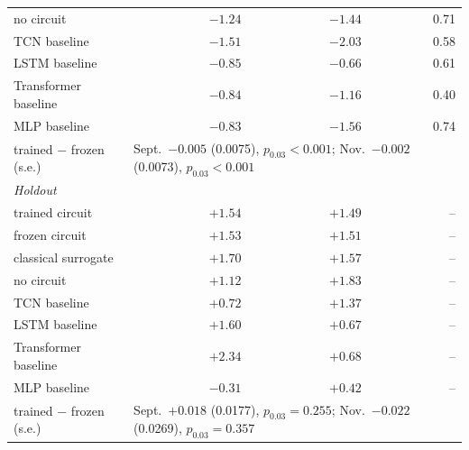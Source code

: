 \begin{table}[t]
\begin{tabular}{lrrr}
\quad no circuit & $-1.24$ & $-1.44$ & 0.71 \\
\quad TCN baseline & $-1.51$ & $-2.03$ & 0.58 \\
\quad LSTM baseline & $-0.85$ & $-0.66$ & 0.61 \\
\quad Transformer baseline & $-0.84$ & $-1.16$ & 0.40 \\
\quad MLP baseline & $-0.83$ & $-1.56$ & 0.74 \\
\quad trained $-$ frozen (s.e.) & \multicolumn{3}{l}{Sept.\ $-0.005$ (0.0075), $p_{0.03}<0.001$; Nov.\ $-0.002$ (0.0073), $p_{0.03}<0.001$} \\[2pt]
\multicolumn{4}{l}{\emph{Holdout}} \\
\quad trained circuit & $+1.54$ & $+1.49$ & -- \\
\quad frozen circuit & $+1.53$ & $+1.51$ & -- \\
\quad classical surrogate & $+1.70$ & $+1.57$ & -- \\
\quad no circuit & $+1.12$ & $+1.83$ & -- \\
\quad TCN baseline & $+0.72$ & $+1.37$ & -- \\
\quad LSTM baseline & $+1.60$ & $+0.67$ & -- \\
\quad Transformer baseline & $+2.34$ & $+0.68$ & -- \\
\quad MLP baseline & $-0.31$ & $+0.42$ & -- \\
\quad trained $-$ frozen (s.e.) & \multicolumn{3}{l}{Sept.\ $+0.018$ (0.0177), $p_{0.03}=0.255$; Nov.\ $-0.022$ (0.0269), $p_{0.03}=0.357$} \\[2pt]
\bottomrule
\end{tabular}
\end{table}
